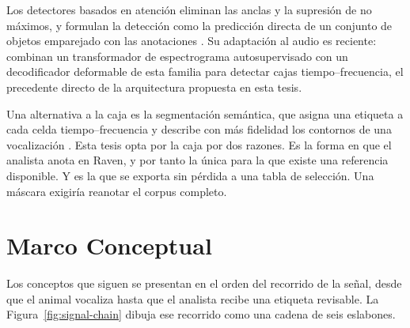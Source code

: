  Los detectores basados en atención
eliminan las anclas y la supresión de no máximos, y formulan la detección como
la predicción directa de un conjunto de objetos emparejado con las anotaciones
\citep{carion_detr_2020}.
Su adaptación al audio es reciente: \citet{zhu_sound_2025} combinan un transformador de espectrograma autosupervisado
con un decodificador deformable de esta familia para detectar cajas
tiempo--frecuencia, el precedente directo de la arquitectura propuesta en esta
tesis.

 Una alternativa a la caja es la segmentación
semántica, que asigna una etiqueta a cada celda tiempo--frecuencia y describe
con más fidelidad los contornos de una vocalización \citep{jin_semantic_2022}.
Esta tesis opta por la caja por dos razones. Es la forma en que el analista anota
en Raven, y por tanto la única para la que existe una referencia disponible. Y es
la que se exporta sin pérdida a una tabla de selección. Una máscara exigiría
reanotar el corpus completo.

\section{Marco Conceptual}

Los conceptos que siguen se presentan en el orden del recorrido de la señal, desde que el animal vocaliza hasta que el analista recibe
una etiqueta revisable. La Figura~\ref{fig:signal-chain} dibuja ese recorrido
como una cadena de seis eslabones.

